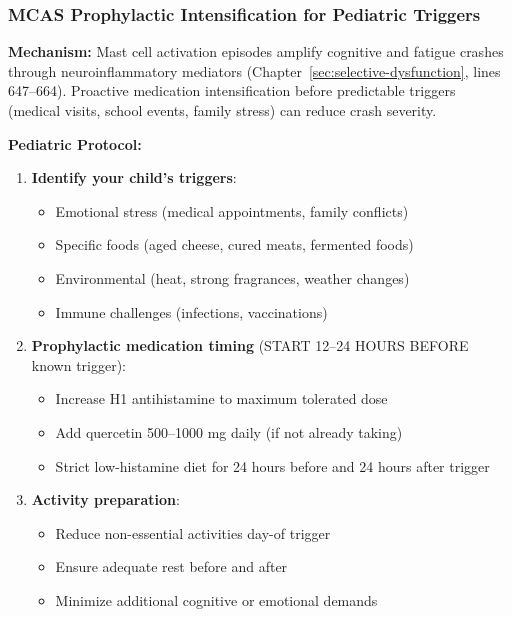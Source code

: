 \subsubsection{MCAS Prophylactic Intensification for Pediatric Triggers}

\begin{recommendation}
\label{rec:mcas-prophylaxis-ped-severe}

\textbf{Mechanism:} Mast cell activation episodes amplify cognitive and fatigue crashes through neuroinflammatory mediators (Chapter~\ref{sec:selective-dysfunction}, lines 647--664). Proactive medication intensification before predictable triggers (medical visits, school events, family stress) can reduce crash severity.

\textbf{Pediatric Protocol:}

\begin{enumerate}
    \item \textbf{Identify your child's triggers}:
    \begin{itemize}
        \item Emotional stress (medical appointments, family conflicts)
        \item Specific foods (aged cheese, cured meats, fermented foods)
        \item Environmental (heat, strong fragrances, weather changes)
        \item Immune challenges (infections, vaccinations)
    \end{itemize}

    \item \textbf{Prophylactic medication timing} (START 12--24 HOURS BEFORE known trigger):
    \begin{itemize}
        \item Increase H1 antihistamine to maximum tolerated dose
        \item Add quercetin 500--1000 mg daily (if not already taking)
        \item Strict low-histamine diet for 24 hours before and 24 hours after trigger
    \end{itemize}

    \item \textbf{Activity preparation}:
    \begin{itemize}
        \item Reduce non-essential activities day-of trigger
        \item Ensure adequate rest before and after
        \item Minimize additional cognitive or emotional demands
    \end{itemize}


\end{enumerate}
\end{recommendation}
